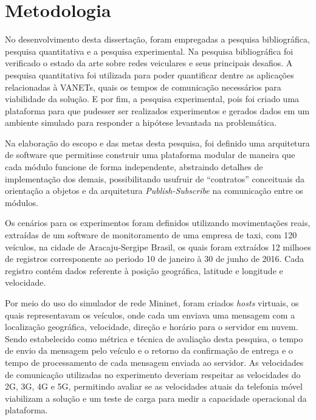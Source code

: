 \documentclass[
	12pt,				%
	oneside,			%
	a4paper,			%
	english,			%
	brazil				%
	]{abntex2ppgsi}
\begin{document}
\section{Metodologia}

No desenvolvimento desta dissertação, foram empregadas a pesquisa bibliográfica, pesquisa quantitativa e a pesquisa experimental. Na pesquisa bibliográfica foi verificado o estado da arte sobre redes veiculares e seus principais desafios. A pesquisa quantitativa foi utilizada para poder quantificar dentre as aplicações relacionadas à VANETs, quais os tempos de comunicação necessários para viabilidade da solução. E por fim, a pesquisa experimental, pois foi criado uma plataforma para que pudesser ser realizados experimentos e gerados dados em um ambiente simulado para responder a hipótese levantada na problemática.

Na elaboração do escopo e das metas desta pesquisa, foi definido uma arquitetura de software que permitisse construir uma plataforma modular de maneira que cada módulo funcione de forma independente, abstraindo detalhes de implementação dos demais, possibilitando usufruir de ``contratos'' conceituais da orientação a objetos e da arquitetura \textit{Publish-Subscribe} na comunicação entre os módulos.

Os cenários para os experimentos foram definidos utilizando movimentações reais, extraídas de um software de monitoramento de uma empresa de taxi, com 120 veículos, na cidade de Aracaju-Sergipe Brasil, os quais foram extraídos 12 milhoes de registros corresponente ao periodo 10 de janeiro à 30 de junho de 2016. Cada registro contém dados referente à posição geográfica, latitude e longitude e velocidade.

Por meio do uso do simulador de rede Mininet, foram criados \textit{hosts} virtuais, os quais representavam os veículos, onde cada um enviava uma mensagem com a localização geográfica, velocidade, direção e horário para o servidor em nuvem. Sendo estabelecido como métrica e técnica de avaliação desta pesquisa, o tempo de envio da mensagem pelo veículo e o retorno da confirmação de entrega e o tempo de processamento de cada mensagem enviada ao servidor.  As velocidades de comunicação utilizadas no experimento deveriam respeitar as velocidades do 2G, 3G, 4G e 5G, permitindo avaliar se as velocidades atuais da telefonia móvel viabilizam a solução e um teste de carga para medir a capacidade operacional da plataforma.

\end{document}
